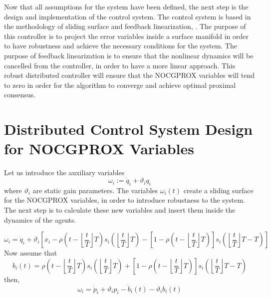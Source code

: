    Now that all assumptions for the system have been defined, the next step is the design and implementation of the control system. The control system is based in the methodology of sliding surface and feedback linearization, \cite{HK2001}. The purpose of this controller is to project the error variables inside a surface manifold in order to have robustness and achieve the necessary conditions for the system. The purpose of feedback linearization is to ensure that the nonlinear dynamics will be cancelled from the controller, in order to have a more linear approach. This robust distributed controller will ensure that the NOCGPROX variables will tend to zero in order for the algorithm to converge and achieve optimal proximal consensus.

\section{Distributed Control System Design for NOCGPROX Variables}

    Let us introduce the auxiliary variables 
    \begin{equation}\label{eq:4.2.1}
        \omega_i := \dot{q}_i + \vartheta_i q_i
    \end{equation}
    where $\vartheta_i$ are static gain parameters. The variables $\omega_i(t)$ create a sliding surface for the NOCGPROX variables, in order to introduce robustness to the system. The next step is to calculate these new variables and insert them inside the dynamics of the agents.
    
    \begin{equation*}
        \omega_i = \dot{q}_i + \vartheta_i \left[x_i - \rho \left(t - \left\lfloor \frac{t}{T}\right\rfloor T \right)s_i \left( \left\lfloor \frac{t}{T}\right\rfloor T \right) - \left[ 1 - \rho \left( t - \left\lfloor \frac{t}{T}\right\rfloor T\right)\right] s_i \left(\left\lfloor \frac{t}{T}\right\rfloor T - T\right)\right]
    \end{equation*}
    Now assume that
    \begin{equation}\label{eq:4.2.2}
        b_i(t) = \rho \left(t - \left\lfloor \frac{t}{T}\right\rfloor T \right)s_i \left( \left\lfloor \frac{t}{T}\right\rfloor T \right) + \left[ 1 - \rho \left( t - \left\lfloor \frac{t}{T}\right\rfloor T\right)\right] s_i \left(\left\lfloor \frac{t}{T}\right\rfloor T - T\right)
    \end{equation}
    then,
    \begin{equation}\label{eq:4.2.3}
        \omega_i = \dot{p}_i + \vartheta_ip_i - \dot{b}_i(t) - \vartheta_ib_i(t)
    \end{equation}
    
